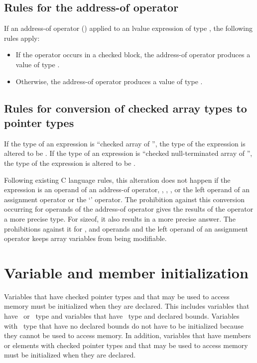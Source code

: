 \subsection{Rules for the address-of operator}

If an address-of operator (\code{&}) applied to an lvalue expression
of type , the following rules apply:

\begin{itemize}
\item
  If the operator occurs in a checked block, the address-of operator
  produces a value of type \arrayptrT.
\item
  Otherwise, the address-of operator produces a value of type 
  \code{*}.
\end{itemize}

\subsection{Rules for conversion of checked array types to pointer types}
\label{section:array-to-pointer-conversion}

If the type of an expression is ``checked array of
'', the type of the expression is altered to be
\arrayptrT.  If the type of an expression is ``checked null-terminated
array of '', the type of the expression is altered to
be \ntarrayptrT.

Following existing C language rules, this alteration does not happen if
the expression is an operand of an address-of operator, \code{++},
\code{--}, , or the left operand of an assignment
operator or the `' operator. The prohibition against this
conversion occurring for operands of the address-of operator gives the
results of the operator a more precise type. For sizeof, it also results
in a more precise answer. The prohibitions against it for \code{++}, and
\code{--} operands and the left operand of an assignment operator keeps array
variables from being modifiable.

\section{Variable and member initialization}

Variables that have checked pointer types and that may be used to access memory
must be initialized when they are declared.   This includes variables that have \ptr\ or
\ntarrayptr\ type and variables that have \arrayptr\ type and declared bounds.
Variables with \arrayptr\ type that have no declared bounds do not have to be initialized
because they cannot be used to access memory.   In addition, variables that have members
or elements with checked pointer types and that may be used to access memory must be
initialized when they are declared.

